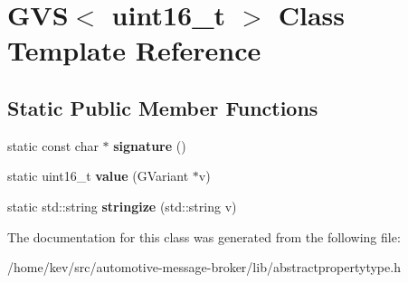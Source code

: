 \hypertarget{classGVS_3_01uint16__t_01_4}{\section{G\-V\-S$<$ uint16\-\_\-t $>$ Class Template Reference}
\label{classGVS_3_01uint16__t_01_4}
}
\subsection*{Static Public Member Functions}
\begin{DoxyCompactItemize}
\item 
\hypertarget{classGVS_3_01uint16__t_01_4_a7db0c4a8cd2454cd49ede1fb7a026e49}{static const char $\ast$ {\bfseries signature} ()}\label{classGVS_3_01uint16__t_01_4_a7db0c4a8cd2454cd49ede1fb7a026e49}

\item 
\hypertarget{classGVS_3_01uint16__t_01_4_a629f9b3cba434e8c808d545ca8a8e557}{static uint16\-\_\-t {\bfseries value} (G\-Variant $\ast$v)}\label{classGVS_3_01uint16__t_01_4_a629f9b3cba434e8c808d545ca8a8e557}

\item 
\hypertarget{classGVS_3_01uint16__t_01_4_a4d7e2288bb0be81487945a42e7aa8224}{static std\-::string {\bfseries stringize} (std\-::string v)}\label{classGVS_3_01uint16__t_01_4_a4d7e2288bb0be81487945a42e7aa8224}

\end{DoxyCompactItemize}


The documentation for this class was generated from the following file\-:\begin{DoxyCompactItemize}
\item 
/home/kev/src/automotive-\/message-\/broker/lib/abstractpropertytype.\-h\end{DoxyCompactItemize}
